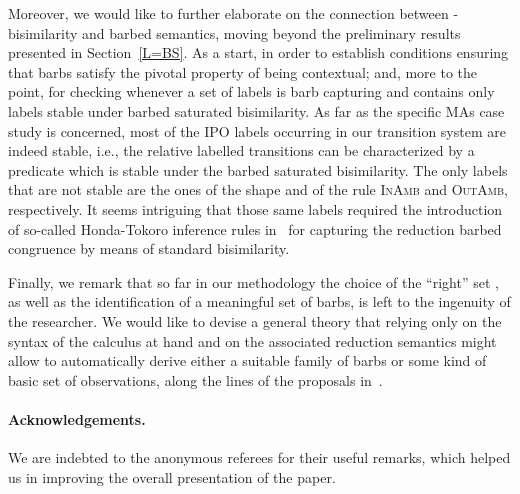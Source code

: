 \documentclass[copyright,creativecommons]{eptcs}
\newcommand{\<}{\langle}
\renewcommand{\>}{\rangle}
\begin{document}
Moreover, we would like to further elaborate on the connection between
-bisimilarity and barbed semantics, moving beyond the preliminary
results presented in Section~\ref{L=BS}. As a start, in order to
establish conditions ensuring that barbs satisfy the pivotal property
of being contextual; and, more to the point, for checking whenever a
set of labels is barb capturing and contains only labels stable under
barbed saturated bisimilarity.
As far as the specific MAs case study
is concerned, most of the IPO labels occurring in our transition
system are indeed stable, i.e., the relative labelled transitions
can be characterized by a
predicate which is stable under the barbed saturated bisimilarity.
The only labels that are not stable are the ones
of the shape  and  of the rule \textsc{InAmb}
and \textsc{OutAmb}, respectively.
It seems intriguing that those same labels required the
introduction of so-called Honda-Tokoro inference rules
in~\cite{PawelAmbient} for capturing the reduction barbed congruence
by means of standard bisimilarity.

Finally, we remark that so far in our methodology the choice of the
``right'' set , as well as the identification of a meaningful set
of barbs, is left to the ingenuity of the researcher. We would like to
devise a general theory that relying only on the syntax of the
calculus at hand and on the associated reduction semantics might allow
to automatically derive either a suitable family of barbs or some kind
of basic set of observations, along the lines of the proposals
in~\cite{HY,PawBarbs,RathkeS09}.

\paragraph{\textbf Acknowledgements.}
We are indebted to the anonymous referees for their useful remarks, which helped
us in improving the overall presentation of the paper.



\end{document}
